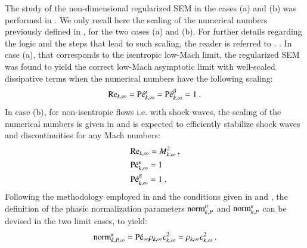 \documentclass[preprint,10pt]{elsarticle}
\begin{document}
The study of the non-dimensional regularized SEM in the cases (a) and (b) was performed in \cite{Marco_paper_sem}. We only recall here the scaling of the numerical numbers previously defined in , for the two cases (a) and (b). For further details regarding the logic and the steps that lead to such scaling, the reader is referred to \cite{Marco_paper_sem}.  . 
In case (a), that corresponds to the isentropic low-Mach limit, the regularized SEM was found to yield the correct 
low-Mach asymptotic limit with well-scaled dissipative terms when the numerical numbers have the following scaling:
%
\begin{equation}\label{eq:isent-flow-num-nb}
\textrm{Re}_{k,\infty} = \textrm{P\'e}_{k,\infty}^\kappa = \textrm{P\'e}_{k,\infty}^\beta =1 \ .
\end{equation}
%
In case (b), for non-isentropic flows i.e. with shock waves, the scaling of the numerical numbers is given in  and is expected to efficiently 
stabilize shock waves and discontinuities for any Mach numbers:
%
\begin{align}\label{eq:non-isent-flow-num-nb}
&\Re_{k,\infty} = M_{k,\infty}^2 \,, \nonumber \\ 
& \Pe_{k,\infty}^\kappa = 
1 \\ %
&\Pe_{k,\infty}^\beta = 1 \ . \nonumber
\end{align}
 
Following the methodology employed in \cite{DelchiniCompFluid2014-euler} and the conditions given in  and , the definition of the 
phasic normalization parameters $\textrm{norm}_{k,P}^\mu$ and $\textrm{norm}_{k,P}^\kappa$ can be devised in the two limit cases, to yield:
%
\begin{equation}
\label{eq:norm_relation_bis}
\textrm{norm}_{k,P,\infty}^{\kappa} = \textrm{P\'e}_\infty \rho_{k,\infty} c_{k,\infty}^2 = \rho_{k,\infty} c_{k,\infty}^2 \, .
\end{equation}
\end{document}
